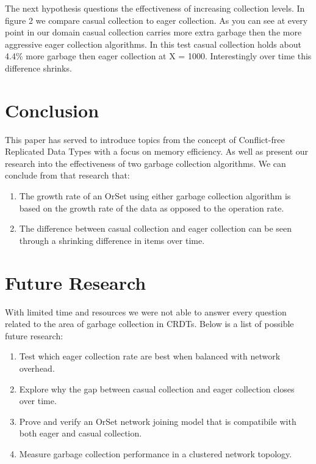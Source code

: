 \documentclass{article}
\begin{document}
\begin{multicols}{2}
\begin{refsection}
The next hypothesis questions the effectiveness of increasing collection
levels. In figure 2 we compare casual collection to eager collection. As
you can see at every point in our domain casual collection carries more
extra garbage then the more aggressive eager collection algorithms.
In this test casual collection holds about 4.4\% more garbage then eager
collection at X = 1000. Interestingly over time this difference shrinks.

\section*{Conclusion}

This paper has served to introduce topics from the concept of
Conflict-free Replicated Data Types with a focus on memory efficiency.
As well as present our research into the effectiveness of two garbage
collection algorithms. We can conclude from that research that:

\begin{enumerate}
    \item The growth rate of an OrSet using either garbage
        collection algorithm is based on the growth rate of
        the data as opposed to the operation rate.
    \bigskip
    \item The difference between casual collection and eager
        collection can be seen through a shrinking difference in
        items over time.
\end{enumerate}

\section*{Future Research}

With limited time and resources we were not able to answer every
question related to the area of garbage collection in CRDTs. Below is a
list of possible future research:

\begin{enumerate}
    \item Test which eager collection rate are best when
        balanced with network overhead.
    \bigskip
    \item Explore why the gap between casual collection and eager
        collection closes over time.
    \bigskip
    \item Prove and verify an OrSet network joining model that
        is compatibile with both eager and casual collection.
    \bigskip
    \item Measure garbage collection performance in a clustered
        network topology.
\end{enumerate}

\printbibliography[title=References]

\end{refsection}

\end{multicols}
\end{document}

